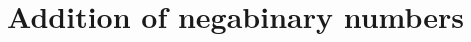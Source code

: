 \documentclass[11pt,a4paper]{article}
\author{Christian Rinderknecht}
\date{4 December 2008}
\begin{document}
\maketitle
\thispagestyle{empty}

\section{Addition of negabinary numbers}


\end{document}
